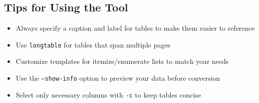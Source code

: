 \documentclass{article}
\begin{document}
\subsection{Tips for Using the Tool}

\begin{itemize}
  \item Always specify a caption and label for tables to make them easier to reference
  \item Use \texttt{longtable} for tables that span multiple pages
  \item Customize templates for itemize/enumerate lists to match your needs
  \item Use the \texttt{--show-info} option to preview your data before conversion
  \item Select only necessary columns with \texttt{-c} to keep tables concise
\end{itemize}
\end{document}
